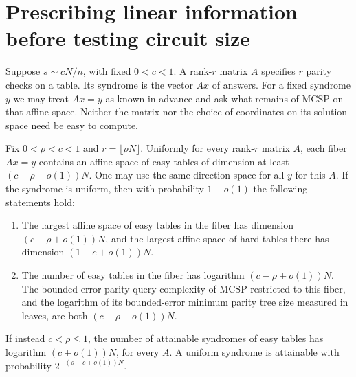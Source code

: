 \section{Prescribing linear information before testing circuit size}
Suppose $s\sim cN/n$, with fixed $0<c<1$. A rank-$r$ matrix $A$ specifies $r$ parity checks on a table. Its syndrome is the vector $Ax$ of answers. For a fixed syndrome $y$ we may treat $Ax=y$ as known in advance and ask what remains of MCSP on that affine space. Neither the matrix nor the choice of coordinates on its solution space need be easy to compute.

\begin{theorem}
Fix $0<\rho<c<1$ and $r=\lfloor\rho N\rfloor$. Uniformly for every rank-$r$ matrix $A$, each fiber $Ax=y$ contains an affine space of easy tables of dimension at least $(c-\rho-o(1))N$. One may use the same direction space for all $y$ for this $A$. If the syndrome is uniform, then with probability $1-o(1)$ the following statements hold:
\begin{enumerate}
\item The largest affine space of easy tables in the fiber has dimension $(c-\rho+o(1))N$, and the largest affine space of hard tables there has dimension $(1-c+o(1))N$.
\item The number of easy tables in the fiber has logarithm $(c-\rho+o(1))N$. The bounded-error parity query complexity of MCSP restricted to this fiber, and the logarithm of its bounded-error minimum parity tree size measured in leaves, are both $(c-\rho+o(1))N$.
\end{enumerate}
If instead $c<\rho\le1$, the number of attainable syndromes of easy tables has logarithm $(c+o(1))N$, for every $A$. A uniform syndrome is attainable with probability $2^{-(\rho-c+o(1))N}$.
\end{theorem}

